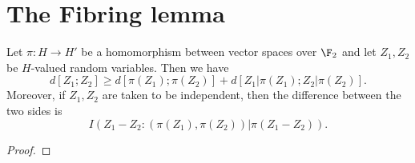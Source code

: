 \chapter{The Fibring lemma}

\begin{proposition}\label{projections-1}
  Let $\pi : H \to H'$ be a homomorphism between vector spaces over $\F_2$ and let $Z_1,Z_2$ be $H$-valued random variables. Then we have
  \[
    d[Z_1; Z_2] \geq d[\pi(Z_1);\pi(Z_2)] + d[Z_1|\pi(Z_1); Z_2 |\pi(Z_2)].
  \]
  Moreover, if $Z_1,Z_2$ are taken to be independent, then the difference between the two sides is
$$I( Z_1 - Z_2 : (\pi(Z_1), \pi(Z_2))  |  \pi(Z_1 - Z_2) ).$$
\end{proposition}


\begin{proof}

\end{proof}
